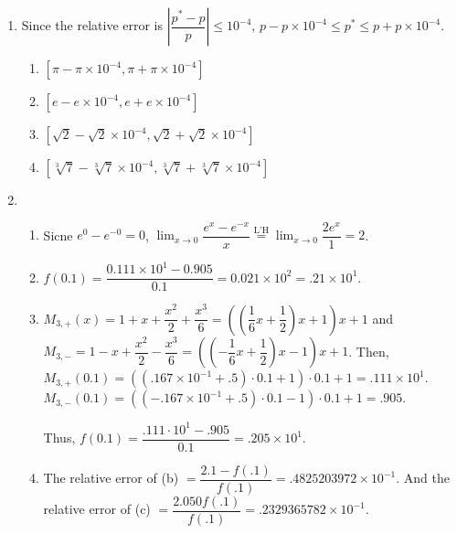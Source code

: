 \documentclass[12pt]{article}
\begin{document}
\begin{enumerate}
    \item Since the relative error is $\left|\dfrac{p^*-p}{p}\right| \leq 10^{-4}$, $p - p\times 10^{-4} \leq p^* \leq p + p\times 10^{-4}$.
    \begin{enumerate}
        \item $[\pi - \pi\times 10^{-4}, \pi + \pi\times 10^{-4}]$
        \item $[e - e\times 10^{-4}, e + e\times 10^{-4}]$
        \item $[\sqrt{2} - \sqrt{2}\times 10^{-4}, \sqrt{2} + \sqrt{2}\times 10^{-4}]$
        \item $[\sqrt[3]{7} - \sqrt[3]{7}\times 10^{-4}, \sqrt[3]{7} + \sqrt[3]{7}\times 10^{-4}]$
    \end{enumerate}

    \item \begin{enumerate}
        \item Sicne $e^{0} - e^{-0} = 0$, $\displaystyle\lim_{x \to 0} \dfrac{e^{x} - e^{-x}}{x} \overset{\text{L'H}}{=} \displaystyle\lim_{x\to 0} \dfrac{2e^{x}}{1} = 2$.
        \item $f(0.1) = \dfrac{0.111\times 10^1 - 0.905}{0.1} = 0.021\times 10^2 = .21 \times 10^1$.
        \item $M_{3, +}(x) = 1 + x + \dfrac{x^2}{2} + \dfrac{x^3}{6} = ((\dfrac{1}{6}x + \dfrac{1}{2})x + 1)x + 1$ 
        and $M_{3, -} = 1 - x + \dfrac{x^2}{2} - \dfrac{x^3}{6} = ((-\dfrac{1}{6}x + \dfrac{1}{2})x - 1)x + 1$.
        Then, $M_{3, +}(0.1) =  ((.167\times 10^{-1} + .5)\cdot 0.1 + 1) \cdot 0.1 + 1 = .111\times 10^{1}$.
        $M_{3, -}(0.1) = ((-.167\times 10^{-1} + .5)\cdot 0.1 - 1)\cdot 0.1 + 1 = .905$.

        Thus, $f(0.1) = \dfrac{.111\cdot 10^1 - .905}{0.1} = .205 \times 10^1$.
    
        \item The relative error of (b) $= \dfrac{2.1 - f(.1)}{f(.1)} = .4825203972 \times 10^{-1}$.
        And the relative error of (c) $= \dfrac{2.05 0 f(.1)}{f(.1)} = .2329365782 \times 10^{-1}$.
    \end{enumerate}
\end{enumerate}
\end{document}
